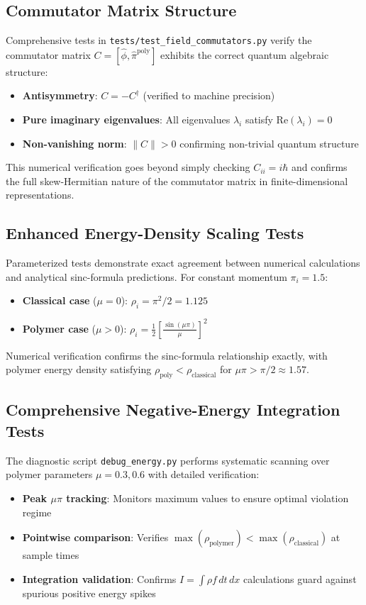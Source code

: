 \documentclass[12pt]{article}
\begin{document}
\subsection{Commutator Matrix Structure}

Comprehensive tests in \texttt{tests/test\_field\_commutators.py} verify the commutator matrix $C = [\hat{\phi}, \hat{\pi}^{\text{poly}}]$ exhibits the correct quantum algebraic structure:
\begin{itemize}
\item \textbf{Antisymmetry}: $C = -C^{\dagger}$ (verified to machine precision)
\item \textbf{Pure imaginary eigenvalues}: All eigenvalues $\lambda_i$ satisfy $\text{Re}(\lambda_i) = 0$
\item \textbf{Non-vanishing norm}: $\|C\| > 0$ confirming non-trivial quantum structure
\end{itemize}

This numerical verification goes beyond simply checking $C_{ii} = i\hbar$ and confirms the full skew-Hermitian nature of the commutator matrix in finite-dimensional representations.

\subsection{Enhanced Energy-Density Scaling Tests}

Parameterized tests demonstrate exact agreement between numerical calculations and analytical sinc-formula predictions. For constant momentum $\pi_i = 1.5$:
\begin{itemize}
\item \textbf{Classical case} ($\mu = 0$): $\rho_i = \pi^2/2 = 1.125$
\item \textbf{Polymer case} ($\mu > 0$): $\rho_i = \frac{1}{2}\left[\frac{\sin(\mu\pi)}{\mu}\right]^2$
\end{itemize}

Numerical verification confirms the sinc-formula relationship exactly, with polymer energy density satisfying $\rho_{\text{poly}} < \rho_{\text{classical}}$ for $\mu\pi > \pi/2 \approx 1.57$.

\subsection{Comprehensive Negative-Energy Integration Tests}

The diagnostic script \texttt{debug\_energy.py} performs systematic scanning over polymer parameters $\mu = 0.3, 0.6$ with detailed verification:
\begin{itemize}
\item \textbf{Peak $\mu\pi$ tracking}: Monitors maximum values to ensure optimal violation regime
\item \textbf{Pointwise comparison}: Verifies $\max(\rho_{\text{polymer}}) < \max(\rho_{\text{classical}})$ at sample times
\item \textbf{Integration validation}: Confirms $I = \int\rho f \, dt \, dx$ calculations guard against spurious positive energy spikes
\end{itemize}
\end{document}

